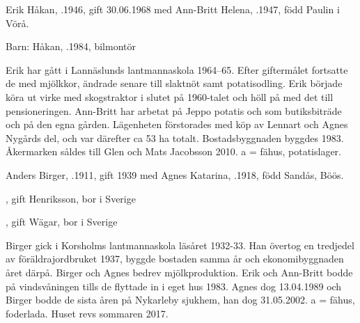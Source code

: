 %
Erik Håkan, .1946, gift 30.06.1968 med Ann-Britt Helena, .1947, född Paulin i Vörå.

Barn:  Håkan, .1984, bilmontör

Erik har gått i Lannäslunds lantmannaskola 1964--65. Efter giftermålet fortsatte de med mjölkkor, ändrade senare till slaktnöt samt potatisodling. Erik började köra ut virke med skogstraktor i slutet på 1960-talet och höll på med det till pensioneringen. Ann-Britt har arbetat på Jeppo potatis och som butiksbiträde och på den egna gården. Lägenheten förstorades med köp av Lennart och Agnes Nygårds del, och var därefter ca 53 ha totalt. Bostadsbyggnaden byggdes 1983. Åkermarken såldes till Glen och Mats Jacobsson 2010. a = fähus, potatislager.



%



%
Anders Birger, .1911, gift 1939 med Agnes Katarina, .1918, född Sandås, Böös.
\begin{jhchildren}
  \item {}, gift Henriksson, bor i Sverige
  \item {}, gift Wägar, bor i Sverige
  \item {}
\end{jhchildren}

Birger gick i Korsholms lantmannaskola läsåret 1932-33. Han övertog en tredjedel av föräldrajordbruket 1937, byggde bostaden samma år och ekonomibyggnaden året därpå. Birger och Agnes bedrev mjölkproduktion. Erik och Ann-Britt bodde på vindsvåningen tills de flyttade in i eget hus 1983. Agnes dog 13.04.1989 och Birger bodde de sista åren på Nykarleby sjukhem, han dog 31.05.2002. a = fähus, foderlada. Huset revs sommaren 2017.



%


